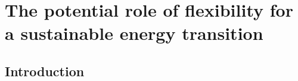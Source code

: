 \chapter{The potential role of flexibility for a sustainable energy transition}
\label{The potential role of flexibility for a sustainable energy transition}
\chaptermark{}

\section{Introduction} \label{Introduction}

